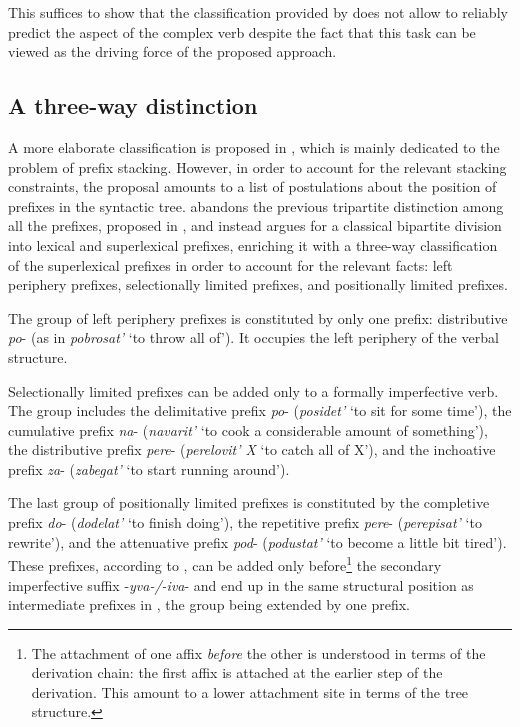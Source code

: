This suffices to show that the classification provided by \citet{Tatevosov:07} does not allow to reliably predict the aspect of the complex verb despite the fact that this task can be viewed as the driving force of the proposed approach. 

\subsection{A three-way distinction}\label{section:Tat09}
A more elaborate classification is proposed in \citealt{Tatevosov:09}, which is mainly dedicated to the problem of prefix stacking. However, in order to account for the relevant stacking constraints, the proposal amounts to a list of postulations about the position of prefixes in the syntactic tree. \citet{Tatevosov:09} abandons the previous tripartite distinction among all the prefixes, proposed in \citet{Tatevosov:07}, and instead argues for a classical bipartite division into lexical and superlexical prefixes, enriching it with a three-way classification of the superlexical prefixes in order to account for the relevant facts: left periphery prefixes, selectionally limited prefixes, and positionally limited prefixes.

The group of left periphery prefixes is constituted by only one prefix: distributive \textit{po}- (as in \textit{pobrosat'} `to throw all of'). It occupies the left periphery of the verbal structure.

Selectionally limited prefixes can be added only to a formally imperfective verb. The group includes the delimitative prefix \textit{po}- (\textit{posidet'} `to sit for some time'), the cumulative prefix \textit{na}- (\textit{navarit'} `to cook a considerable amount of something'), the distributive prefix \textit{pere}- (\textit{perelovit' X} `to catch all of X'), and the inchoative prefix \textit{za}- (\textit{zabegat'} `to start running around').

The last group of positionally limited prefixes is constituted by the completive prefix \textit{do}- (\textit{dodelat'} `to finish doing'), the repetitive prefix \textit{pere}- (\textit{perepisat'} `to rewrite'), and the attenuative prefix \textit{pod}- (\textit{podustat'} `to become a little bit tired'). These prefixes, according to \citet{Tatevosov:09}, can be added only before\footnote{The attachment of one affix \textit{before} the other is understood in terms of the derivation chain: the first affix is attached at the earlier step of the derivation. This amount to a lower attachment site in terms of the tree structure.} the secondary imperfective suffix -\textit{yva-/-iva}- and end up in the same structural position as intermediate prefixes in \citet{Tatevosov:07}, the group being extended by one prefix.
	
